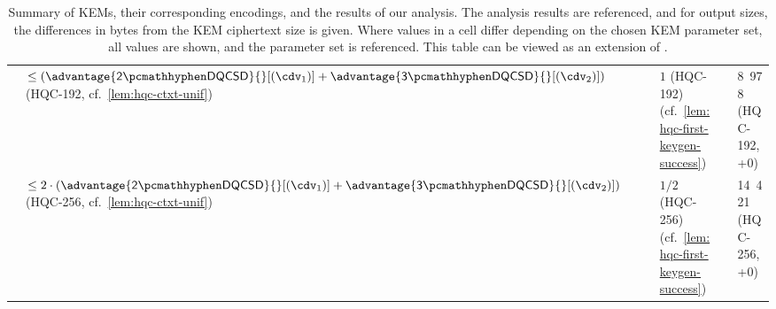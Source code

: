 \begin{table}
{\begin{tabular}{@{} L{0.18\textwidth-\tabcolsep} | L{0.41\tabcolsep} L{0.19\tabcolsep} L{0.16\tabcolsep} L{0.23\textwidth-\tabcolsep} @{}}
        & $\leq \left( \advantage{\twodqcsd}{}[(\cdv_1)] + \advantage{\threedqcsd}{}[(\cdv_2)] \right)$\newline
        (\textsf{HQC-192}, cf.~\cref{lem:hqc-ctxt-unif})\vspace{0.5em}
        & $1$ (\textsf{HQC-192})\newline
        (cf.~\cref{lem:hqc-first-keygen-success})
        &
        & 8~978 (\textsf{HQC-192}, +0)
        \\

        & $\leq 2 \cdot \left( \advantage{\twodqcsd}{}[(\cdv_1)] + \advantage{\threedqcsd}{}[(\cdv_2)] \right)$\newline
        (\textsf{HQC-256}, cf.~\cref{lem:hqc-ctxt-unif})\vspace{0.5em}
        & $1/2$ (\textsf{HQC-256})\newline
        (cf.~\cref{lem:hqc-first-keygen-success})
        &
        & 14~421 (\textsf{HQC-256}, +0)
    \end{tabular}
    }
    \caption[
        Summary of KEMs, their corresponding encodings, and the results of our analysis.
    ]{
        Summary of KEMs, their corresponding encodings, and the results of our analysis. The analysis results are referenced, and for output sizes, the differences in bytes from the KEM ciphertext size is given. Where values in a cell differ depending on the chosen KEM parameter set, all values are shown, and the parameter set is referenced. This table can be viewed as an extension of \cite[Table~2]{CCS:GunSteVei24}.
    }
    \label{tab:obfuscation-summary}
\end{table}
